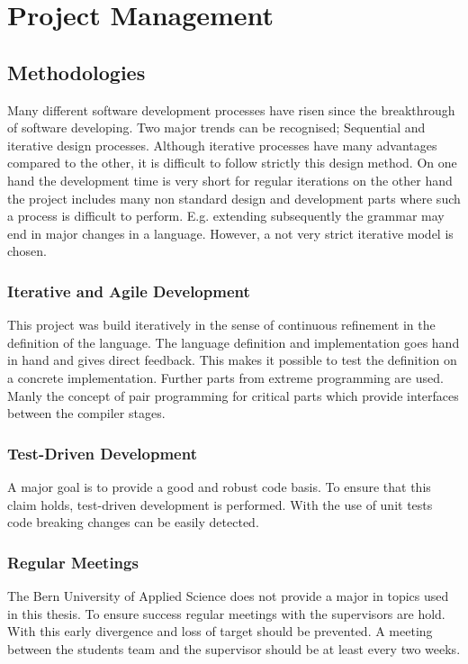 \part{Project Management}
\chapter{Methodologies}
Many different software development processes have risen since the
breakthrough of software developing. Two major trends can be recognised;
Sequential and iterative design processes. Although iterative processes
have many advantages compared to the other, it is difficult to follow
strictly this design method. On one hand the development time is very
short for regular iterations on the other hand the project includes
many non standard design and development parts where such a process is
difficult to perform. E.g. extending subsequently the grammar may end
in major changes in a language. However, a not very strict iterative
model is chosen.

\section{Iterative and Agile Development}
This project was build iteratively in the sense of continuous refinement in the definition of the language. The language definition and implementation goes hand in hand and gives direct feedback. This makes it possible to test the definition on a concrete implementation. Further parts from extreme programming are used. Manly the concept of pair programming for critical parts which provide interfaces between the compiler stages.

\section{Test-Driven Development}
A major goal is to provide a good and robust code basis. To ensure that this claim holds, test-driven development is performed. With the use of unit tests code breaking changes can be easily detected. 

\section{Regular Meetings}
The Bern University of Applied Science does not provide a major in topics used in this thesis. To ensure success regular meetings with the supervisors are hold. With this early divergence and loss of target should be prevented. A meeting between the students team and the supervisor should be at least every two weeks.

